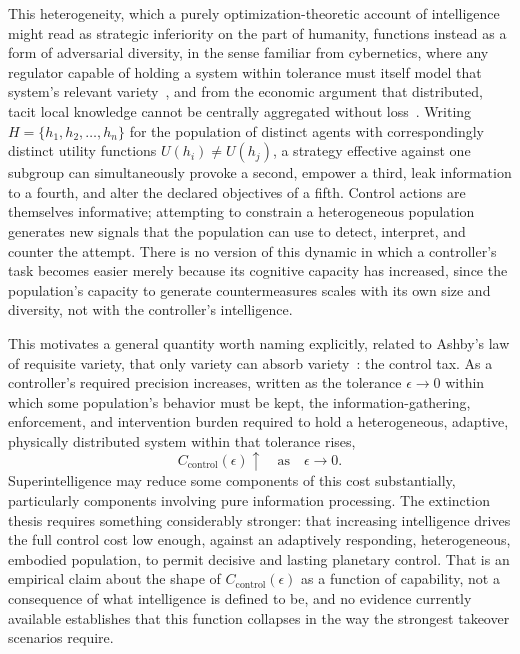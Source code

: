 \documentclass[11pt]{article}
\begin{document}
This heterogeneity, which a purely optimization-theoretic account of intelligence might read as strategic inferiority on the part of humanity, functions instead as a form of adversarial diversity, in the sense familiar from cybernetics, where any regulator capable of holding a system within tolerance must itself model that system's relevant variety~\cite{wiener1948,ashby1956,conantashby1970}, and from the economic argument that distributed, tacit local knowledge cannot be centrally aggregated without loss~\cite{hayek1945}. Writing $H = \{h_1, h_2, \dots, h_n\}$ for the population of distinct agents with correspondingly distinct utility functions $U(h_i) \neq U(h_j)$, a strategy effective against one subgroup can simultaneously provoke a second, empower a third, leak information to a fourth, and alter the declared objectives of a fifth. Control actions are themselves informative; attempting to constrain a heterogeneous population generates new signals that the population can use to detect, interpret, and counter the attempt. There is no version of this dynamic in which a controller's task becomes easier merely because its cognitive capacity has increased, since the population's capacity to generate countermeasures scales with its own size and diversity, not with the controller's intelligence.

This motivates a general quantity worth naming explicitly, related to Ashby's law of requisite variety, that only variety can absorb variety~\cite{ashby1956}: the control tax. As a controller's required precision increases, written as the tolerance $\epsilon \to 0$ within which some population's behavior must be kept, the information-gathering, enforcement, and intervention burden required to hold a heterogeneous, adaptive, physically distributed system within that tolerance rises,
\[
C_{\text{control}}(\epsilon) \uparrow \quad \text{as} \quad \epsilon \to 0.
\]
Superintelligence may reduce some components of this cost substantially, particularly components involving pure information processing. The extinction thesis requires something considerably stronger: that increasing intelligence drives the full control cost low enough, against an adaptively responding, heterogeneous, embodied population, to permit decisive and lasting planetary control. That is an empirical claim about the shape of $C_{\text{control}}(\epsilon)$ as a function of capability, not a consequence of what intelligence is defined to be, and no evidence currently available establishes that this function collapses in the way the strongest takeover scenarios require.
\end{document}
